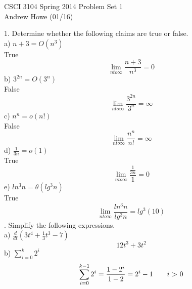 \documentclass[12pt]{article}
\newcommand{\tab}{\hspace*{2em}}
\begin{document}
CSCI 3104 Spring 2014 \hfill Problem Set 1\\
Andrew Howe (01/16) 

\hrulefill

1. Determine whether the following claims are true or false. \\
\tab a)  \begin{math} n+3=O(n^3) \end{math} \\
\tab\tab True \begin{dmath}\lim_{n to \infty}\frac{n+3}{n^3}=0\end{dmath} 
\tab b)  \begin{math}3^{2n}=O(3^n)\end{math} \\
\tab\tab False   \begin{dmath}\lim_{n to \infty}\frac{3^{2n}}{3^n}=\infty\end{dmath}
\tab c)  \begin{math}n^n=o(n!)\end{math} \\
\tab\tab False  \begin{dmath}\lim_{n to \infty} \frac{n^n}{n!}=\infty\end{dmath}
\tab d)  \begin{math}\frac{1}{3n} = o(1) \end{math} \\
\tab\tab True  \begin{dmath}\lim_{n to \infty}\frac{\frac{1}{3n}}{1}=0\end{dmath}
\tab e)  \begin{math}ln^3n=\theta (lg^3n) \end{math}\\
\tab\tab True \begin{dmath}\lim_{n to \infty} \frac{ln^3n}{lg^3n}	=	lg^3(10) \end{dmath} 
. Simplify the following expressions. \\
\tab a) 	\begin{math}\frac{d}{dt}(3t^4+\frac{1}{3}t^3-7) \end{math}\\
\begin{dmath}12t^3+3t^2  \end{dmath}
\tab b)		\begin{math}\sum_{i=0}^k 2^i		\end{math}\\
\begin{dmath*}\sum_{i=0}^{k-1} 2^i=\frac{1-2^i}{1-2} = 2^i-1\tab \text{$i$ $>$ 0}\end{dmath*}
\end{document}
